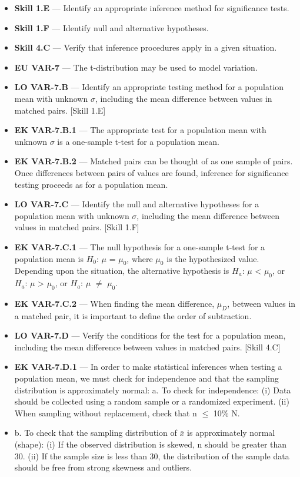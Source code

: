 \documentclass[11pt]{article}
\begin{document}


{\small
\begin{itemize}[leftmargin=1.5em,itemsep=2pt,topsep=2pt]
  \item \textbf{Skill 1.E} --- Identify an appropriate inference method for significance tests.
  \item \textbf{Skill 1.F} --- Identify null and alternative hypotheses.
  \item \textbf{Skill 4.C} --- Verify that inference procedures apply in a given situation.
  \item \textbf{EU VAR-7} --- The t-distribution may be used to model variation.
  \item \textbf{LO VAR-7.B} --- Identify an appropriate testing method for a population mean with unknown $\sigma$, including the mean difference between values in matched pairs. [Skill 1.E]
  \item \textbf{EK VAR-7.B.1} --- The appropriate test for a population mean with unknown $\sigma$ is a one-sample t-test for a population mean.
  \item \textbf{EK VAR-7.B.2} --- Matched pairs can be thought of as one sample of pairs. Once differences between pairs of values are found, inference for significance testing proceeds as for a population mean.
  \item \textbf{LO VAR-7.C} --- Identify the null and alternative hypotheses for a population mean with unknown $\sigma$, including the mean difference between values in matched pairs. [Skill 1.F]
  \item \textbf{EK VAR-7.C.1} --- The null hypothesis for a one-sample t-test for a population mean is $H_0$: $\mu$ = $\mu_0$, where $\mu_0$ is the hypothesized value. Depending upon the situation, the alternative hypothesis is $H_a$: $\mu$ < $\mu_0$, or $H_a$: $\mu$ > $\mu_0$, or $H_a$: $\mu$ $\neq$ $\mu_0$.
  \item \textbf{EK VAR-7.C.2} --- When finding the mean difference, $\mu_D$, between values in a matched pair, it is important to define the order of subtraction.
  \item \textbf{LO VAR-7.D} --- Verify the conditions for the test for a population mean, including the mean difference between values in matched pairs. [Skill 4.C]
  \item \textbf{EK VAR-7.D.1} --- In order to make statistical inferences when testing a population mean, we must check for independence and that the sampling distribution is approximately normal: a. To check for independence: (i) Data should be collected using a random sample or a randomized experiment. (ii) When sampling without replacement, check that n $\leq$ 10\% N.
  \item b. To check that the sampling distribution of $\bar{x}$ is approximately normal (shape): (i) If the observed distribution is skewed, n should be greater than 30. (ii) If the sample size is less than 30, the distribution of the sample data should be free from strong skewness and outliers.
\end{itemize}
}
\end{document}
